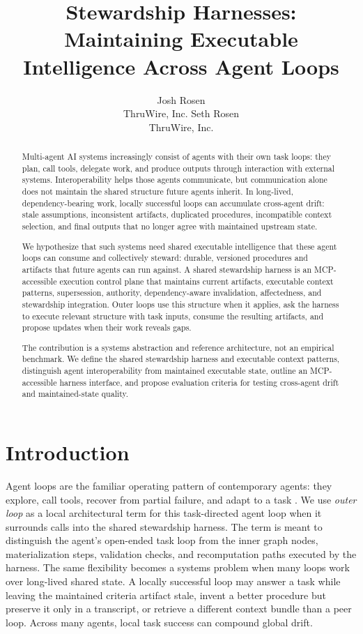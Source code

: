 \documentclass{article}
\title{Stewardship Harnesses:\\
Maintaining Executable Intelligence Across Agent Loops}
\author{
  Josh Rosen \\
  ThruWire, Inc.
  \And
  Seth Rosen \\
  ThruWire, Inc.
}
\begin{document}
\maketitle

\begin{abstract}
Multi-agent AI systems increasingly consist of agents with their own task loops: they plan, call tools, delegate work, and produce outputs through interaction with external systems. Interoperability helps those agents communicate, but communication alone does not maintain the shared structure future agents inherit. In long-lived, dependency-bearing work, locally successful loops can accumulate cross-agent drift: stale assumptions, inconsistent artifacts, duplicated procedures, incompatible context selection, and final outputs that no longer agree with maintained upstream state.

We hypothesize that such systems need shared executable intelligence that these agent loops can consume and collectively steward: durable, versioned procedures and artifacts that future agents can run against. A shared stewardship harness is an MCP-accessible execution control plane that maintains current artifacts, executable context patterns, supersession, authority, dependency-aware invalidation, affectedness, and stewardship integration. Outer loops use this structure when it applies, ask the harness to execute relevant structure with task inputs, consume the resulting artifacts, and propose updates when their work reveals gaps.

The contribution is a systems abstraction and reference architecture, not an empirical benchmark. We define the shared stewardship harness and executable context patterns, distinguish agent interoperability from maintained executable state, outline an MCP-accessible harness interface, and propose evaluation criteria for testing cross-agent drift and maintained-state quality.
\end{abstract}

\section{Introduction}

Agent loops are the familiar operating pattern of contemporary agents: they explore, call tools, recover from partial failure, and adapt to a task \cite{yao2023react,schick2023toolformer,wu2023autogen,li2023camel,hong2023metagpt,wang2023voyager}. We use \emph{outer loop} as a local architectural term for this task-directed agent loop when it surrounds calls into the shared stewardship harness. The term is meant to distinguish the agent's open-ended task loop from the inner graph nodes, materialization steps, validation checks, and recomputation paths executed by the harness. The same flexibility becomes a systems problem when many loops work over long-lived shared state. A locally successful loop may answer a task while leaving the maintained criteria artifact stale, invent a better procedure but preserve it only in a transcript, or retrieve a different context bundle than a peer loop. Across many agents, local task success can compound global drift.
\end{document}
